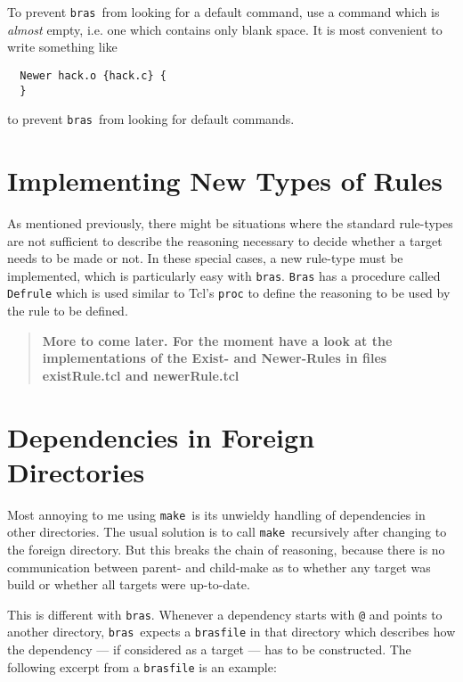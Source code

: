 \documentclass[12pt]{article}
\newcommand{\bras}{\texttt{bras}}
\newcommand{\Bras}{\texttt{Bras}}
\newcommand{\make}{\texttt{make}}
\begin{document}
To prevent \bras\ from looking for a default command, use a command
which is \textit{almost} empty, i.e. one which contains only blank
space. It is most convenient to write something like
\begin{verbatim}
  Newer hack.o {hack.c} {
  }
\end{verbatim}
to prevent \bras\ from looking for default commands.

\section{Implementing New Types of Rules}
\label{secNewRules}
As mentioned previously, there might be situations where the standard
rule-types are not sufficient to describe the reasoning necessary to
decide whether a target needs to be made or not. In these special
cases, a new rule-type must be implemented, which is particularly easy
with \bras{}. \Bras{} has a procedure called \texttt{Defrule} which is
used similar to Tcl's \texttt{proc} to define the reasoning to be
used by the rule to be defined.

\begin{quote}\bf
More to come later. For the moment have a look at the implementations
of the Exist- and Newer-Rules in files existRule.tcl and newerRule.tcl
\end{quote}



\section{Dependencies in Foreign Directories}

Most annoying to me using \make\ is its unwieldy handling of
dependencies in other directories. The usual solution is to call
\make\ recursively after changing to the foreign directory. But this
breaks the chain of reasoning, because there is no communication
between parent- and child-make as to whether any target was build or
whether all targets were up-to-date.

This is different with \bras. Whenever a dependency starts with
\texttt{@} and points to another directory, \bras\ expects
a \texttt{brasfile} in that directory which describes how the
dependency --- if considered as a target --- has to be constructed.
The following excerpt from a \texttt{brasfile} is an example:
\end{document}
